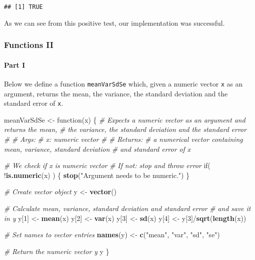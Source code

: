 \documentclass[11,]{article}
\newenvironment{Shaded}{\begin{snugshade}}{\end{snugshade}}
\newcommand{\KeywordTok}[1]{\textcolor[rgb]{0.13,0.29,0.53}{\textbf{{#1}}}}
\newcommand{\DecValTok}[1]{\textcolor[rgb]{0.00,0.00,0.81}{{#1}}}
\newcommand{\StringTok}[1]{\textcolor[rgb]{0.31,0.60,0.02}{{#1}}}
\newcommand{\CommentTok}[1]{\textcolor[rgb]{0.56,0.35,0.01}{\textit{{#1}}}}
\newcommand{\NormalTok}[1]{{#1}}
\let\oldparagraph\paragraph
\renewcommand{\paragraph}[1]{\oldparagraph{#1}\mbox{}}
\begin{document}
\begin{verbatim}
## [1] TRUE
\end{verbatim}

As we can see from this positive test, our implementation was
successful.

\subsubsection{Functions II}\label{functions-ii}

\paragraph{Part I}\label{part-i}

Below we define a function \texttt{meanVarSdSe} which, given a numeric
vector \texttt{x} as an argument, returns the mean, the variance, the
standard deviation and the standard error of \texttt{x}.

\begin{Shaded}
\begin{Highlighting}[]
\NormalTok{meanVarSdSe <-}\StringTok{ }\NormalTok{function(x) \{}
  \CommentTok{# Expects a numeric vector as an argument and returns the mean,}
  \CommentTok{# the variance, the standard deviation and the standard error}
  \CommentTok{# }
  \CommentTok{# Args:}
  \CommentTok{#   x: numeric vector}
  \CommentTok{#}
  \CommentTok{# Returns:}
  \CommentTok{#   a numerical vector containing mean, variance, standard deviation}
  \CommentTok{#   and standard error of x}
  
  \CommentTok{# We check if x is numeric vector}
  \CommentTok{# If not: stop and throw error}
  \NormalTok{if( !}\KeywordTok{is.numeric}\NormalTok{(x) ) \{}
    \KeywordTok{stop}\NormalTok{(}\StringTok{"Argument needs to be numeric."}\NormalTok{)}
  \NormalTok{\}}
  
  \CommentTok{# Create vector object}
  \NormalTok{y <-}\StringTok{ }\KeywordTok{vector}\NormalTok{()}
  
  \CommentTok{# Calculate mean, variance, standard deviation and standard error}
  \CommentTok{# and save it in y}
  \NormalTok{y[}\DecValTok{1}\NormalTok{] <-}\StringTok{ }\KeywordTok{mean}\NormalTok{(x)}
  \NormalTok{y[}\DecValTok{2}\NormalTok{] <-}\StringTok{ }\KeywordTok{var}\NormalTok{(x)}
  \NormalTok{y[}\DecValTok{3}\NormalTok{] <-}\StringTok{ }\KeywordTok{sd}\NormalTok{(x)}
  \NormalTok{y[}\DecValTok{4}\NormalTok{] <-}\StringTok{ }\NormalTok{y[}\DecValTok{3}\NormalTok{]/}\KeywordTok{sqrt}\NormalTok{(}\KeywordTok{length}\NormalTok{(x))}
  
  \CommentTok{# Set names to vector entries}
  \KeywordTok{names}\NormalTok{(y) <-}\StringTok{ }\KeywordTok{c}\NormalTok{(}\StringTok{"mean"}\NormalTok{, }\StringTok{"var"}\NormalTok{, }\StringTok{"sd"}\NormalTok{, }\StringTok{"se"}\NormalTok{)}
  
  \CommentTok{# Return the numeric vector y}
  \NormalTok{y}
\NormalTok{\}}
\end{Highlighting}
\end{Shaded}
\end{document}
